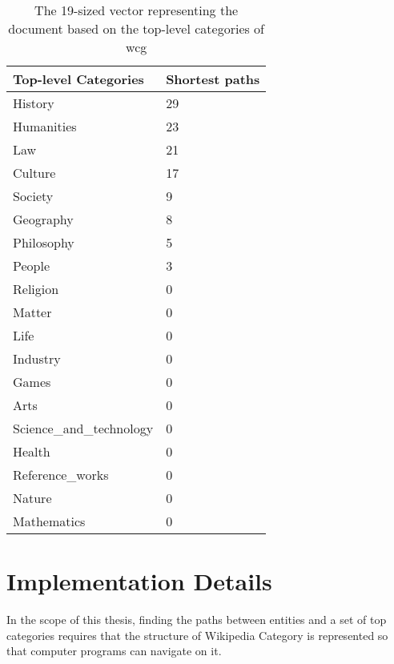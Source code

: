 \begin{table}[H]
\centering
\caption{The 19-sized vector representing the document based on the top-level categories of \gls{wcg}}
\label{tab:vector}
\begin{tabular}{@{}ll@{}}
\toprule
Top-level Categories     & Shortest paths \\ \midrule
History                  & 29             \\
Humanities               & 23             \\
Law                      & 21             \\
Culture                  & 17             \\
Society                  & 9              \\
Geography                & 8              \\
Philosophy               & 5              \\
People                   & 3              \\
Religion                 & 0              \\
Matter                   & 0              \\
Life                     & 0              \\
Industry                 & 0              \\
Games                    & 0              \\
Arts                     & 0              \\
Science\_and\_technology & 0              \\
Health                   & 0              \\
Reference\_works         & 0              \\
Nature                   & 0              \\
Mathematics              & 0              \\ \bottomrule
\end{tabular}
\end{table}






\section{\hspace*{3pt}Implementation Details}
In the scope of this thesis, finding the paths between entities and a set of top categories requires that the structure of Wikipedia Category is represented so that computer programs can navigate on it. 

